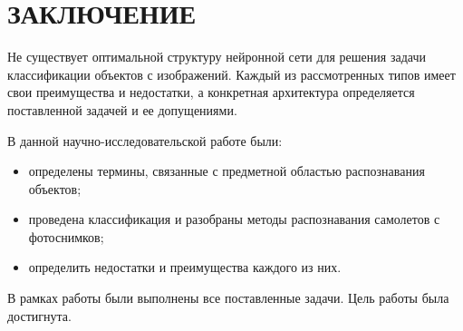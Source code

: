 \chapter*{ЗАКЛЮЧЕНИЕ}
Не существует оптимальной структуру нейронной сети для решения задачи классификации объектов с изображений. Каждый из рассмотренных типов имеет свои преимущества и недостатки, а конкретная архитектура определяется поставленной задачей и ее допущениями.

В данной научно-исследовательской работе были:
\begin{itemize}
	\item определены термины, связанные с предметной областью распознавания объектов;
	\item проведена классификация и разобраны методы распознавания самолетов с фотоснимков;
	\item определить недостатки и преимущества каждого из них.
\end{itemize}

В рамках работы были выполнены все поставленные задачи. Цель работы была достигнута.